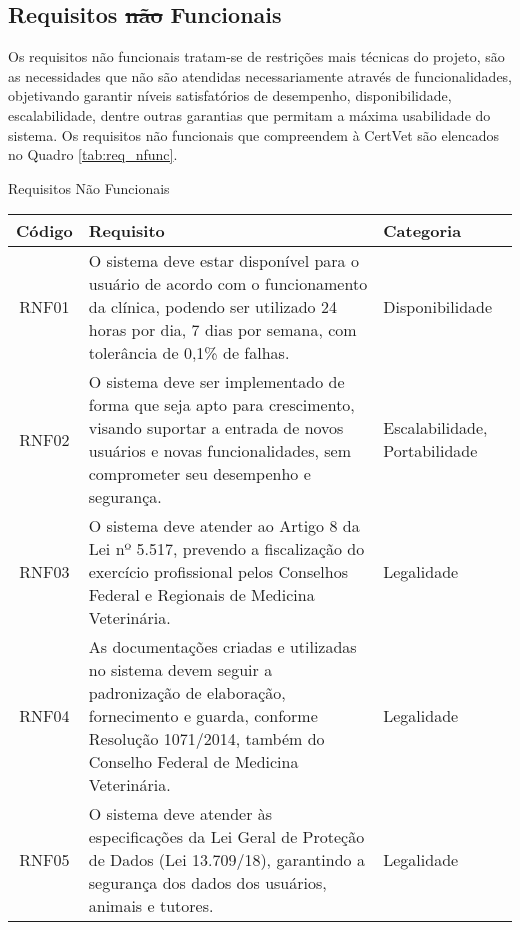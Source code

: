 \documentclass[
    12pt,               %
    openright,          %
    oneside,
    a4paper,            %
    BIBLATEX,           %
    TODO,               %
    english,            %
    brazil              %
    ]{ifsp-spo-inf-ctds}
\providecommand{\DIFadd}[1]{{\protect\color{blue}\uwave{#1}}} %
\providecommand{\DIFdel}[1]{{\protect\color{red}\sout{#1}}}                      %
\providecommand{\DIFaddbegin}{} %
\providecommand{\DIFaddend}{} %
\providecommand{\DIFdelbegin}{} %
\providecommand{\DIFdelend}{} %
\newcommand{\DIFscaledelfig}{0.5}
\newlength{\DIFdelgraphicswidth} %
\newlength{\DIFdelgraphicsheight} %
\newcommand{\DIFaddincludegraphics}[2][]{{\color{blue}\fbox{\DIFOincludegraphics[#1]{#2}}}} %
\newcommand{\DIFdelincludegraphics}[2][]{%
\sbox{\DIFdelgraphicsbox}{\DIFOincludegraphics[#1]{#2}}%
\settoboxwidth{\DIFdelgraphicswidth}{\DIFdelgraphicsbox} %
\settoboxtotalheight{\DIFdelgraphicsheight}{\DIFdelgraphicsbox} %
\scalebox{\DIFscaledelfig}{%
\parbox[b]{\DIFdelgraphicswidth}{\usebox{\DIFdelgraphicsbox}\\[-\baselineskip] \rule{\DIFdelgraphicswidth}{0em}}\llap{\resizebox{\DIFdelgraphicswidth}{\DIFdelgraphicsheight}{%
\setlength{\unitlength}{\DIFdelgraphicswidth}%
\begin{picture}(1,1)%
\thicklines\linethickness{2pt} %
{\color[rgb]{1,0,0}\put(0,0){\framebox(1,1){}}}%
{\color[rgb]{1,0,0}\put(0,0){\line( 1,1){1}}}%
{\color[rgb]{1,0,0}\put(0,1){\line(1,-1){1}}}%
\end{picture}%
}\hspace*{3pt}}} %
} %
\DeclareRobustCommand{\DIFaddbegin}{\DIFOaddbegin \let\includegraphics\DIFaddincludegraphics} %
\DeclareRobustCommand{\DIFaddend}{\DIFOaddend \let\includegraphics\DIFOincludegraphics} %
\DeclareRobustCommand{\DIFdelbegin}{\DIFOdelbegin \let\includegraphics\DIFdelincludegraphics} %
\DeclareRobustCommand{\DIFdelend}{\DIFOaddend \let\includegraphics\DIFOincludegraphics} %
\begin{document}
        \subsection{Requisitos \DIFdelbegin \DIFdel{não }\DIFdelend \DIFaddbegin \DIFadd{Não }\DIFaddend Funcionais}

            Os requisitos não funcionais tratam-se de restrições mais técnicas do projeto, são as necessidades que não são atendidas necessariamente através de funcionalidades, objetivando garantir níveis satisfatórios  de desempenho, disponibilidade, escalabilidade, dentre outras garantias que permitam a máxima usabilidade do sistema. Os requisitos não funcionais que compreendem à CertVet são elencados no Quadro \ref{tab:req_nfunc}.

            \begin{center}
                \begin{quadro}[h]
                  \caption{Requisitos Não Funcionais}
                \begin{tabulary}{1.0\textwidth}{|C|p{25em}|p{7em}|}
                \hline
                Código & Requisito & Categoria\\
                \hline
                RNF01 & O sistema deve estar disponível para o usuário de acordo com o funcionamento da clínica, podendo ser utilizado 24 horas por dia, 7 dias por semana, com tolerância de 0,1\% de falhas. & Disponibilidade\\
                \hline
                RNF02 & O sistema deve ser implementado de forma que seja apto para crescimento, visando suportar a entrada de novos usuários e novas funcionalidades, sem comprometer seu desempenho e segurança. & Escalabilidade, Portabilidade\\
                \hline
                RNF03 & O sistema deve atender ao Artigo 8 da Lei nº 5.517, prevendo a fiscalização do exercício profissional pelos Conselhos Federal e Regionais de Medicina Veterinária. & Legalidade\\
                \hline
                RNF04 & As documentações criadas e utilizadas no sistema devem seguir a padronização de elaboração, fornecimento e guarda, conforme Resolução 1071/2014, também do Conselho Federal de Medicina Veterinária. & Legalidade\\
                \hline
                RNF05 & O sistema deve atender às especificações da Lei Geral de Proteção de Dados (Lei 13.709/18), garantindo a segurança dos dados dos usuários, animais e tutores. & Legalidade\\

\end{tabulary}
\end{quadro}
\end{center}
\end{document}
